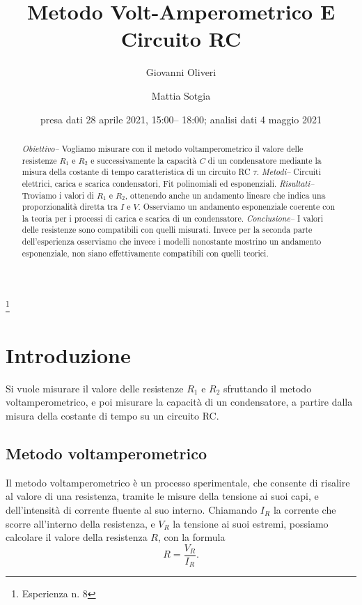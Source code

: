 \documentclass[
    reprint, 
    superscriptaddress, 
    altaffilletter, 
    amsmath, 
    amssymb, 
    a4paper
]{revtex4-2}
\begin{document}
\title{Metodo Volt-Amperometrico E Circuito RC}
\thanks{Esperienza n. 8}

\author{Giovanni Oliveri}
\author{Mattia Sotgia}

\date{presa dati
28 aprile 2021, 15:00– 18:00; analisi dati 
4 maggio 2021}

\begin{abstract}
    \textit{Obiettivo-- }
    Vogliamo misurare con il metodo voltamperometrico il valore delle resistenze $R_1$ e $R_2$ e successivamente la capacità $C$ di un condensatore mediante la misura della costante di tempo caratteristica di un circuito RC $\tau$.
    \textit{Metodi-- }
    Circuiti elettrici, carica e scarica condensatori, Fit polinomiali ed esponenziali. 
    \textit{Risultati-- }
    Troviamo i valori di $R_1$ e $R_2$, ottenendo anche un andamento lineare che indica una proporzionalità diretta tra $I$ e $V$. Osserviamo un andamento esponenziale coerente con la teoria per i processi di carica e scarica di un condensatore.
    \textit{Conclusione-- }
    I valori delle resistenze sono compatibili con quelli misurati. Invece per la seconda parte dell'esperienza osserviamo che invece i modelli nonostante mostrino un andamento esponenziale, non siano effettivamente compatibili con quelli teorici.
\end{abstract}
\maketitle
\thispagestyle{fancy}

\section{Introduzione}
    \label{section:introduction}

    Si vuole misurare il valore delle resistenze $R_1$ e $R_2$ sfruttando il metodo voltamperometrico, e poi misurare la capacità di un condensatore, a partire dalla misura della costante di tempo su un circuito RC. 

    \subsection{Metodo voltamperometrico}

    Il metodo voltamperometrico è un processo sperimentale, che consente di risalire al valore di una resistenza, tramite le misure della tensione ai suoi capi, e dell’intensità di corrente fluente al suo interno. Chiamando $I_R$ la corrente che scorre all’interno della resistenza, e $V_R$ la tensione ai suoi estremi, possiamo calcolare il valore della resistenza $R$, con la formula \[R=\frac{V_R}{I_R}.\]
\end{document}
